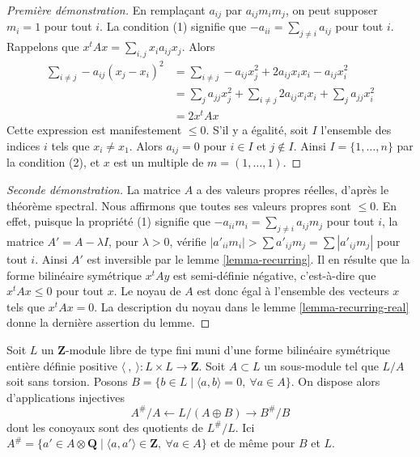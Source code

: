\begin{proof}[Première démonstration]
En remplaçant $a_{ij}$ par $a_{ij}m_im_j$, on peut supposer $m_i = 1$
pour tout $i$. La condition (1) signifie que $-a_{ii} = \sum_{j \not = i} a_{ij}$
pour tout $i$. Rappelons que $x^tAx = \sum_{i, j} x_ia_{ij}x_j$.
Alors
\begin{align*}
\sum\nolimits_{i \not = j} -a_{ij}(x_j - x_i)^2 & =
\sum\nolimits_{i \not = j} -a_{ij}x_j^2 + 2a_{ij}x_ix_i - a_{ij}x_i^2 \\
& =
\sum\nolimits_j a_{jj} x_j^2 +
\sum\nolimits_{i \not = j} 2a_{ij}x_ix_i +
\sum\nolimits_j a_{jj} x_i^2 \\
& = 2x^tAx
\end{align*}
Cette expression est manifestement $\leq 0$. S'il y a égalité, soit $I$ l'ensemble
des indices $i$ tels que $x_i \not = x_1$. Alors $a_{ij} = 0$ pour $i \in I$
et $j \not \in I$. Ainsi $I = \{1, \ldots, n\}$ par la condition (2), et
$x$ est un multiple de $m = (1, \ldots, 1)$.
\end{proof}

\begin{proof}[Seconde démonstration]
La matrice $A$ a des valeurs propres réelles, d'après le théorème spectral.
Nous affirmons que toutes ses valeurs propres sont $\leq 0$.
En effet, puisque la propriété (1) signifie que
$-a_{ii}m_i = \sum_{j \not = i} a_{ij}m_j$ pour tout $i$,
la matrice $A' = A - \lambda I$, pour $\lambda > 0$,
vérifie $|a'_{ii}m_i| > \sum a'_{ij}m_j = \sum |a'_{ij}m_j|$ pour tout $i$.
Ainsi $A'$ est inversible par le lemme \ref{lemma-recurring}.
Il en résulte que la forme bilinéaire symétrique $x^tAy$
est semi-définie négative, c'est-à-dire que $x^tAx \leq 0$ pour tout $x$.
Le noyau de $A$ est donc égal
à l'ensemble des vecteurs $x$ tels que $x^tAx = 0$.
La description du noyau dans le lemme \ref{lemma-recurring-real}
donne la dernière assertion du lemme.
\end{proof}

\begin{lemma}
\label{lemma-orthogonal-direct-sum}
Soit $L$ un $\mathbf{Z}$-module libre de type fini muni
d'une forme bilinéaire symétrique entière définie positive
$\langle\ ,\ \rangle : L \times L \to \mathbf{Z}$.
Soit $A \subset L$ un sous-module tel que $L/A$ soit sans torsion. Posons
$B = \{b \in L \mid \langle a, b\rangle = 0,\ \forall a \in A\}$.
On dispose alors d'applications injectives
$$
A^\#/A \leftarrow L/(A \oplus B) \rightarrow B^\#/B
$$
dont les conoyaux sont des quotients de $L^\#/L$. Ici
$A^\# = \{a' \in A \otimes \mathbf{Q} \mid
\langle a, a'\rangle \in \mathbf{Z},\ \forall a \in A\}$
et de même pour $B$ et $L$.
\end{lemma}


